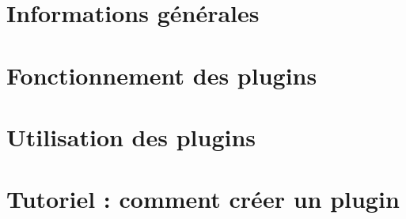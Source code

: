 \documentclass[a4paper]{report}
\begin{document}



\tableofcontents

\chapter{Informations générales}



\chapter{Fonctionnement des plugins}



\chapter{Utilisation des plugins}



\chapter{Tutoriel : comment créer un plugin}

\end{document}
